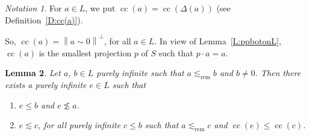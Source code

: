 \documentclass[psamsfonts,reqno]{memo-l}
\theoremstyle{plain}
\newtheorem{lemma}{Lemma}[section]
\theoremstyle{definition}
\theoremstyle{remark}
\newtheorem{notation}[lemma]{Notation}
\numberwithin{equation}{section}
\newcommand{\srem}{\lesssim_{\mathrm{rem}}}
\newcommand{\bv}[1]{\left\|#1\right\|}
\DeclareMathOperator{\cc}{cc}
\newcommand{\DD}{\Delta}
\begin{document}
\begin{notation}
For $a\in L$, we put $\cc(a)=\cc(\DD(a))$ (see Definition~\ref{D:cc(a)}).
\end{notation}

So, $\cc(a)=\bv{a\sim 0}^\bot$, for all $a\in L$. In view of
Lemma~\ref{L:ppbotonL}, $\cc(a)$ is the smallest projection $p$ of $S$ such
that $p\cdot a=a$.

\begin{lemma}\label{L:LocM5}
Let $a$, $b\in L$ purely infinite such that $a\srem b$ and $b\neq 0$. Then
there exists a purely infinite $e\in L$ such that
\begin{enumerate}
\item $e\leq b$ and $e\not\lesssim a$.

\item $e\lesssim c$, for all purely infinite $c\leq b$ such that $a\srem c$
and $\cc(e)\leq\cc(c)$.

\end{enumerate}
\end{lemma}
\end{document}
